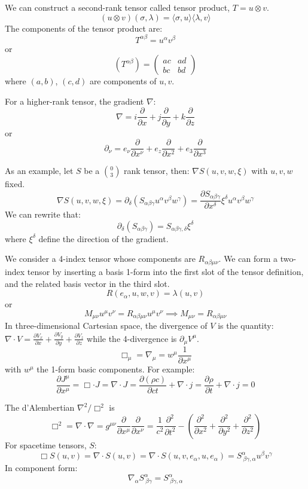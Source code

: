 \documentclass{article}
\begin{document}
    We can construct a second-rank tensor called tensor product, $T = u \otimes v$.
    $$ (u \otimes v)(\sigma, \lambda) = \langle \sigma, u \rangle \langle \lambda, v \rangle $$
    The components of the tensor product are:
    $$ T^{\alpha \beta} = u^\alpha v^\beta $$
    or
    $$ (T^{\alpha \beta}) = \begin{pmatrix} ac & ad \\ bc & bd \end{pmatrix} $$
    where $(a,b)$, $(c,d)$ are components of $u,v$.
    
    For a higher-rank tensor, the gradient $\nabla$:
    $$ \nabla = i \frac{\partial}{\partial x} + j \frac{\partial}{\partial y} + k \frac{\partial}{\partial z} $$
    or
    $$ \partial_\nu = e_\nu \frac{\partial}{\partial x^\nu} + e_z \frac{\partial}{\partial x^2} + e_3 \frac{\partial}{\partial x^3} $$
    
    As an example, let $S$ be a $\binom{0}{3}$ rank tensor, then: $\nabla S(u,v,w, \xi)$ with $u,v,w$ fixed.
    $$ \nabla S(u,v,w, \xi) = \partial_\delta (S_{\alpha \beta \gamma} u^\alpha v^\beta w^\gamma) = \frac{\partial S_{\alpha \beta \gamma}}{\partial x^\delta} \xi^\delta u^\alpha v^\beta w^\gamma $$
    We can rewrite that:
    $$ \partial_\delta (S_{\alpha \beta \gamma}) = S_{\alpha \beta \gamma, \delta} \xi^\delta $$
    where $\xi^\delta$ define the direction of the gradient.
    
    We consider a 4-index tensor whose components are $R_{\alpha \beta \mu \nu}$. We can form a two-index tensor by inserting a basis 1-form into the first slot of the tensor definition, and the related basis vector in the third slot.
    $$ R(e_\alpha, u, w, v) = \lambda(u,v) $$
    or
    $$ M_{\mu \nu} u^\mu v^\nu = R_{\alpha \beta \mu \nu} u^\mu v^\nu \implies M_{\mu \nu} = R_{\alpha \beta \mu \nu} $$
    In three-dimensional Cartesian space, the divergence of $V$ is the quantity: $\nabla \cdot V = \frac{\partial V_x}{\partial x} + \frac{\partial V_y}{\partial y} + \frac{\partial V_z}{\partial z}$ while the 4-divergence is $\partial_\mu V^\mu$.
    $$ \Box_\mu = \nabla_\mu = w^\mu \frac{1}{\partial x^\mu} $$
    with $w^\mu$ the 1-form basic components. For example:
    $$ \frac{\partial J^\mu}{\partial x^\mu} = \Box \cdot J = \nabla \cdot J = \frac{\partial (\rho c)}{\partial c t} + \nabla \cdot j = \frac{\partial \rho}{\partial t} + \nabla \cdot j = 0 $$
    
    The d'Alembertian $\nabla^2 / \Box^2$ is
    $$ \Box^2 = \nabla \cdot \nabla = g^{\mu \nu} \frac{\partial}{\partial x^\mu} \frac{\partial}{\partial x^\nu} = \frac{1}{c^2} \frac{\partial^2}{\partial t^2} - (\frac{\partial^2}{\partial x^2} + \frac{\partial^2}{\partial y^2} + \frac{\partial^2}{\partial z^2}) $$
    For spacetime tensors, $S$:
    $$ \Box S(u,v) = \nabla \cdot S(u,v) = \nabla \cdot S(u,v, e_\alpha, u, e_\alpha) = S^\alpha_{\ \beta \gamma, \alpha} u^\beta v^\gamma $$
    In component form:
    $$ \nabla_\alpha S^\alpha_{\ \beta \gamma} = S^\alpha_{\ \beta \gamma, \alpha} $$
    
\end{document}
